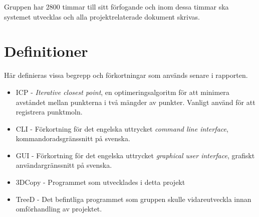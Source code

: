 Gruppen har 2800 timmar till sitt förfogande och inom dessa timmar ska systemet utvecklas och alla projektrelaterade dokument skrivas.

\section{Definitioner}
\label{sec:definitions}
Här definieras vissa begrepp och förkortningar som används senare i rapporten.

\begin{itemize}
	\item ICP - \textit{Iterative closest point}, en optimeringsalgoritm för att minimera avståndet mellan punkterna i två mängder av punkter. Vanligt använd för att registrera punktmoln.
	\item CLI - Förkortning för det engelska uttrycket \textit{command line interface}, kommandoradsgränssnitt på svenska.
	\item GUI - Förkortning för det engelska uttrycket \textit{graphical user interface}, grafiskt användargränssnitt på svenska.
	\item 3DCopy - Programmet som utvecklades i detta projekt
	\item TreeD - Det befintliga programmet som gruppen skulle vidareutveckla innan omförhandling av projektet.
\end{itemize} 


